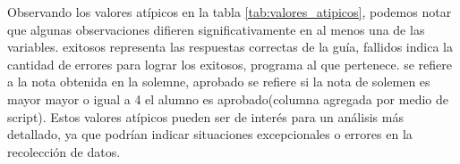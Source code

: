 Observando los valores atípicos en la tabla \ref{tab:valores_atipicos}, podemos notar que algunas observaciones difieren significativamente en al menos una de las variables. exitosos representa las respuestas correctas de la guía, fallidos indica la cantidad de errores para lograr los exitosos, programa al que pertenece.  se refiere a la nota obtenida en la solemne, aprobado se refiere si la nota de solemen es mayor mayor o igual a 4 el alumno es aprobado(columna agregada por medio de script). Estos valores atípicos pueden ser de interés para un análisis más detallado, ya que podrían indicar situaciones excepcionales o errores en la recolección de datos.